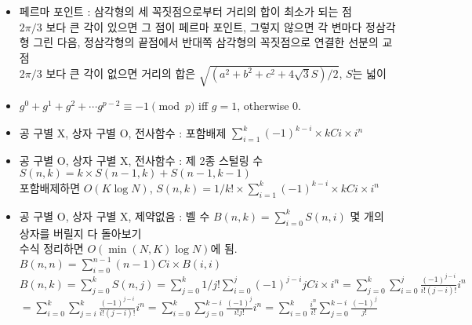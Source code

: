 \documentclass[landscape, 8pt, a4paper, oneside, twocolumn]{extarticle}
\begin{document}
\begin{itemize}
\item 페르마 포인트 : 삼각형의 세 꼭짓점으로부터 거리의 합이 최소가 되는 점\\
$2\pi/3$ 보다 큰 각이 있으면 그 점이 페르마 포인트, 그렇지 않으면 각 변마다 정삼각형 그린 다음, 정삼각형의 끝점에서 반대쪽 삼각형의 꼭짓점으로 연결한 선분의 교점\\
$2\pi/3$ 보다 큰 각이 없으면 거리의 합은 $\sqrt{(a^2 + b^2 + c^2 + 4\sqrt 3 S) / 2}$, $S$는 넓이

\item $g^0+g^1+g^2+\cdots g^{p-2}\equiv -1 \pmod p$ iff $g=1$, otherwise $0$.

\end{itemize}

{}{}{}{}{}
\begin{itemize}
\setlength\itemsep{0.1em}

\item 공 구별 X, 상자 구별 O, 전사함수 : 포함배제 $\sum_{i=1}^{k} (-1)^{k-i} \times kCi \times i^n$
\item 공 구별 O, 상자 구별 X, 전사함수 : 제 2종 스털링 수 $S(n,k)=k\times S(n-1,k) + S(n-1, k-1)$\\
포함배제하면 $O(K \log N)$, $S(n,k) = 1/k! \times \sum_{i=1}^{k} (-1)^{k-i} \times kCi \times i^n$
\item 공 구별 O, 상자 구별 X, 제약없음 : 벨 수 $B(n,k) = \sum_{i=0}^{k} S(n,i)$ 몇 개의 상자를 버릴지 다 돌아보기\\
수식 정리하면 $O(\min(N,K)\log N)$에 됨. $B(n,n) = \sum_{i=0}^{n-1} (n-1)Ci \times B(i,i)$\\
$B(n,k)=\sum_{j=0}^{k}S(n,j) = \sum_{j=0}^{k} 1/j! \sum_{i=0}^{j} (-1)^{j-i} jCi \times i^n=\sum_{j=0}^{k}\sum_{i=0}^{j} \frac{(-1)^{j-i}}{i!(j-i)!}i^n$\\
$=\sum_{i=0}^{k}\sum_{j=i}^{k}\frac{(-1)^{j-i}}{i!(j-i)!}i^n = \sum_{i=0}^{k}\sum_{j=0}^{k-i}\frac{(-1)^j}{i!j!}i^n = \sum_{i=0}^k \frac{i^n}{i!}\sum_{j=0}^{k-i} \frac{(-1)^j}{j!}$



\end{itemize}
\end{document}
